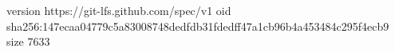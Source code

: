 version https://git-lfs.github.com/spec/v1
oid sha256:147ecaa04779c5a83008748dedfdb31fdedff47a1cb96b4a453484c295f4ecb9
size 7633
